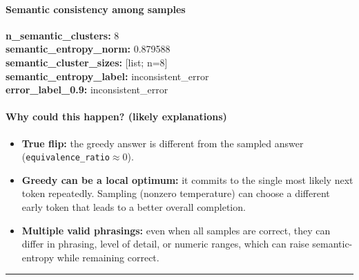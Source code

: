 \documentclass[11pt]{article}
\newcommand{\mono}[1]{\texttt{#1}}
\begin{document}
\paragraph{Semantic consistency among samples}
\textbf{n\_semantic\_clusters:} 8\\
\textbf{semantic\_entropy\_norm:} 0.879588\\
\textbf{semantic\_cluster\_sizes:} [list; n=8]\\
\textbf{semantic\_entropy\_label:} inconsistent\_error\\
\textbf{error\_label\_0.9:} inconsistent\_error\\
\paragraph{Why could this happen? (likely explanations)}
\begin{itemize}
\item \textbf{True flip:} the greedy answer is different from the sampled answer (\mono{equivalence\_ratio}$\approx 0$).
\item \textbf{Greedy can be a local optimum:} it commits to the single most likely next token repeatedly. Sampling (nonzero temperature) can choose a different early token that leads to a better overall completion.
\item \textbf{Multiple valid phrasings:} even when all samples are correct, they can differ in phrasing, level of detail, or numeric ranges, which can raise semantic-entropy while remaining correct.
\end{itemize}
\vspace{10pt}
\hrule
\vspace{10pt}
\end{document}
